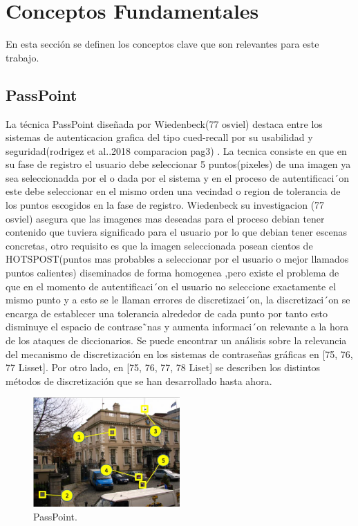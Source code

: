 \documentclass[12pt]{report}
\begin{document}
\section{Conceptos Fundamentales}
En esta sección se definen los conceptos clave que son relevantes para este trabajo. 

\subsection{PassPoint}
	La técnica PassPoint diseñada por Wiedenbeck(77 osviel) destaca entre los sistemas de autenticacion grafica del tipo cued-recall por su usabilidad y seguridad(rodrigez et al..2018 comparacion pag3) .
	La tecnica consiste en que  en su fase de registro el
	usuario debe seleccionar 5 puntos(pixeles) de una imagen ya sea seleccionadda por el o dada por el sistema  y en el proceso de
	autentificaci´on este debe seleccionar en el mismo orden una vecindad o region de tolerancia de los puntos escogidos en la fase de registro.
	Wiedenbeck su investigacion (77 osviel) asegura que las imagenes mas deseadas para el proceso debian tener contenido que tuviera significado para el usuario por lo que debian tener escenas concretas, otro requisito es que la imagen seleccionada posean cientos de HOTSPOST(puntos mas probables a seleccionar por el usuario o mejor llamados puntos calientes) diseminados de forma homogenea
	,pero existe el problema de que en el momento de autentificaci´on el usuario no seleccione exactamente el mismo punto y a esto se le llaman errores de discretizaci´on, la discretizaci´on se encarga de establecer una tolerancia alrededor de cada punto por tanto esto disminuye el espacio de contrase˜nas y aumenta informaci´on relevante a la hora de los ataques de diccionarios. Se puede encontrar un análisis sobre la relevancia del mecanismo de discretización en los sistemas de contraseñas gráficas en [75, 76, 77 Lisset]. Por otro lado, en [75, 76, 77, 78 Liset] se describen los distintos métodos de discretización que se han desarrollado hasta ahora.\\
	\begin{figure}[ht]
		\centering
		\includegraphics[width=0.5\textwidth]{passpoint.png}
		\caption{PassPoint.}
		\label{fig:PassPoint}
	\end{figure}
	
\end{document}
